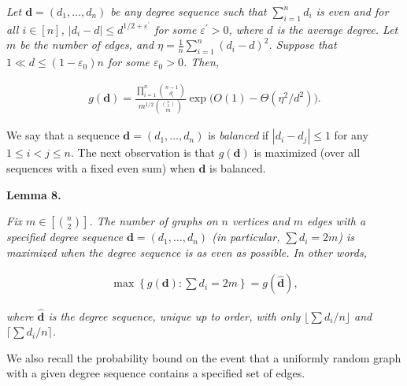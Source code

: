 \documentclass[10pt,a4paper]{article}
\begin{document}
\emph{Let $\mathbf{d}=(d_{1},\ldots,d_{n})$ be any degree sequence such that $\sum_{i=1}^{n}d_{i}$ is
even and for all $i\in[n]$, $|d_{i}-d|\leq d^{1/2+\varepsilon^{\prime}}$
for some $\varepsilon^{\prime}>0$, where $d$ is the average degree.
Let $m$ be the number of edges, and
$\eta=\frac{1}{n}\sum_{i=1}^{n}(d_{i}-d)^{2}$.
Suppose that $1\ll d\leq(1-\varepsilon_{0})n$ for some $\varepsilon_{0}>0$.
Then,}\par


\[\begin{gathered}
g(\mathbf{d})=\frac{\prod_{i=1}^{n}\binom{n-1}{d_{i}}}{m^{1/2}\binom{\binom{n}{2}}{m}}\exp\bigl(O(1)-\Theta(\eta^{2}/d^{2})\bigr).
\end{gathered}\]






We say that a sequence $\mathbf{d}=(d_{1},\ldots,d_{n})$ is \emph{balanced} if $|d_{i}-d_{j}|\leq 1$ for any $1\leq i<j\leq n$. The next observation is that $g(\mathbf{d})$ is maximized (over all sequences with a fixed even sum) when $\mathbf{d}$ is balanced.\par





\par\medskip\noindent\textbf{
\textbf{Lemma 8}\textbf{.}
}\par



\emph{Fix $m\in\left[\binom{n}{2}\right]$. The number of graphs on $n$ vertices and $m$ edges with a specified degree sequence $\mathbf{d}=(d_{1},\ldots,d_{n})$ (in particular, $\sum d_{i}=2m$) is maximized when the degree sequence is as even as possible. In other words,}\par


\[\begin{gathered}
\max\left\{g(\mathbf{d}):\sum d_{i}=2m\right\}=g(\mathbf{\hat{d}}),
\end{gathered}\]


\emph{where $\mathbf{\hat{d}}$ is the degree sequence, unique up to order, with only $\lfloor\sum d_{i}/n\rfloor$ and $\lceil\sum d_{i}/n\rceil$.}\par






We also recall the probability bound on the event that a uniformly random graph with a given degree sequence contains a specified set of edges.\par
\end{document}
